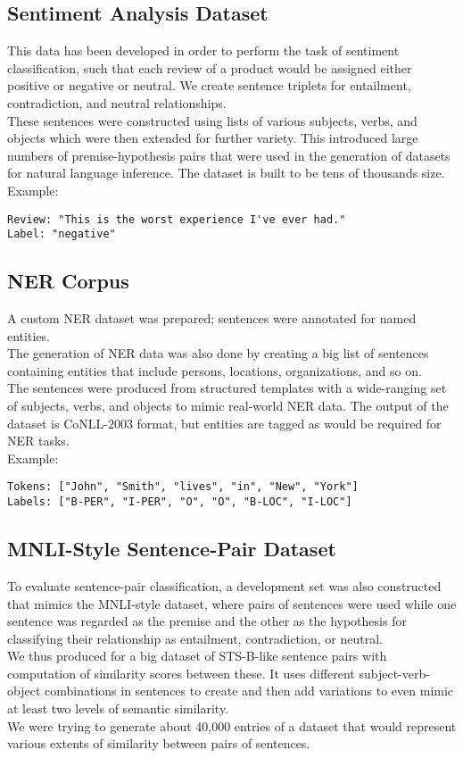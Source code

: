 \documentclass{article}
\begin{document}
\subsection{Sentiment Analysis Dataset}
This data has been developed in order to perform the task of sentiment classification, such that each review of a product would be assigned either positive or negative or neutral.
We create sentence triplets for entailment, contradiction, and neutral relationships.\\
These sentences were constructed using lists of various subjects, verbs, and objects which were then extended for further variety.
This introduced large numbers of premise-hypothesis pairs that were used in the generation of datasets for natural language inference.
The dataset is built to be tens of thousands size.\\
Example:

\begin{verbatim}
Review: "This is the worst experience I've ever had."
Label: "negative"
\end{verbatim}

\subsection{NER Corpus}
A custom NER dataset was prepared; sentences were annotated for named entities.\\
The generation of NER data was also done by creating a big list of sentences containing entities that include persons, locations, organizations, and so on.\\
The sentences were produced from structured templates with a wide-ranging set of subjects, verbs, and objects to mimic real-world NER data.
The output of the dataset is CoNLL-2003 format, but entities are tagged as would be required for NER tasks.\\
Example:
\begin{verbatim}
Tokens: ["John", "Smith", "lives", "in", "New", "York"]
Labels: ["B-PER", "I-PER", "O", "O", "B-LOC", "I-LOC"]
\end{verbatim}

\subsection{MNLI-Style Sentence-Pair Dataset}
To evaluate sentence-pair classification, a development set was also constructed that mimics the MNLI-style dataset, where pairs of sentences were used while one sentence was regarded as the premise and the other as the hypothesis for classifying their relationship as entailment, contradiction, or neutral.\\
We thus produced for a big dataset of STS-B-like sentence pairs with computation of similarity scores between these.
It uses different subject-verb-object combinations in sentences to create and then add variations to even mimic at least two levels of semantic similarity.\\
We were trying to generate about 40,000 entries of a dataset that would represent various extents of similarity between pairs of sentences.
\end{document}
